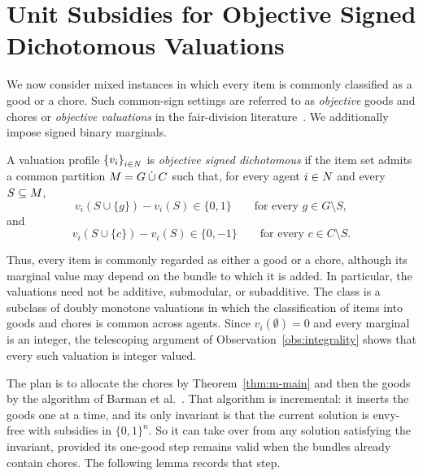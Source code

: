 \section{Unit Subsidies for Objective Signed Dichotomous Valuations}
\label{sec:objective-mixed}

We now consider mixed instances in which every item is commonly classified as a
good or a chore. Such common-sign settings are referred to as \emph{objective}
goods and chores or \emph{objective valuations} in the fair-division
literature~\cite{aziz2022fair,bilo2026approximately}. We additionally impose
signed binary marginals.

\begin{definition}
\label{def:objective-signed}
A valuation profile $\left\{v_i\right\}_{i \in N}$ is \emph{objective signed
dichotomous} if the item set admits a common partition
$M = G \mathbin{\dot\cup} C$ such that, for every agent $i \in N$ and
every $S \subseteq M$,
\[
  v_i(S\cup\{g\})-v_i(S)\in\{0,1\}
  \qquad
  \text{for every }g\in G\setminus S,
\]
and
\[
  v_i(S\cup\{c\})-v_i(S)\in\{0,-1\}
  \qquad
  \text{for every }c\in C\setminus S.
\]
\end{definition}

Thus, every item is commonly regarded as either a good or a chore, although its
marginal value may depend on the bundle to which it is added. In particular, the
valuations need not be additive, submodular, or subadditive. The class is a
subclass of doubly monotone valuations in which the classification of items into
goods and chores is common across agents. Since $v_i(\emptyset) = 0$ and every
marginal is an integer, the telescoping argument of
Observation~\ref{obs:integrality} shows that every such valuation is integer
valued.

The plan is to allocate the chores by Theorem~\ref{thm:m-main} and then the goods
by the algorithm of Barman et al.~\cite{BKNS22}. That algorithm is incremental:
it inserts the goods one at a time, and its only invariant is that the current
solution is envy-free with subsidies in $\{0,1\}^n$. So it can take over from any
solution satisfying the invariant, provided its one-good step remains valid when
the bundles already contain chores. The following lemma records that step.

